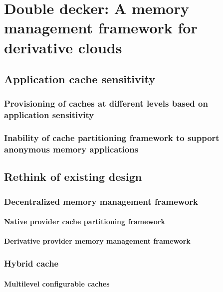 \chapter{Double decker: A memory management framework for derivative clouds}



  \section{Application cache sensitivity}
  
    \subsection{Provisioning of caches at different levels based on application sensitivity}
    
    \subsection{Inability of cache partitioning framework to support anonymous memory applications}
    
    

  \section{Rethink of existing design}
  
    \subsection{Decentralized memory management framework}
	      
      \subsubsection{Native provider cache partitioning framework}

      \subsubsection{Derivative provider memory management framework}	

    \subsection{Hybrid cache}
      
      \subsubsection{Multilevel configurable caches}
      

